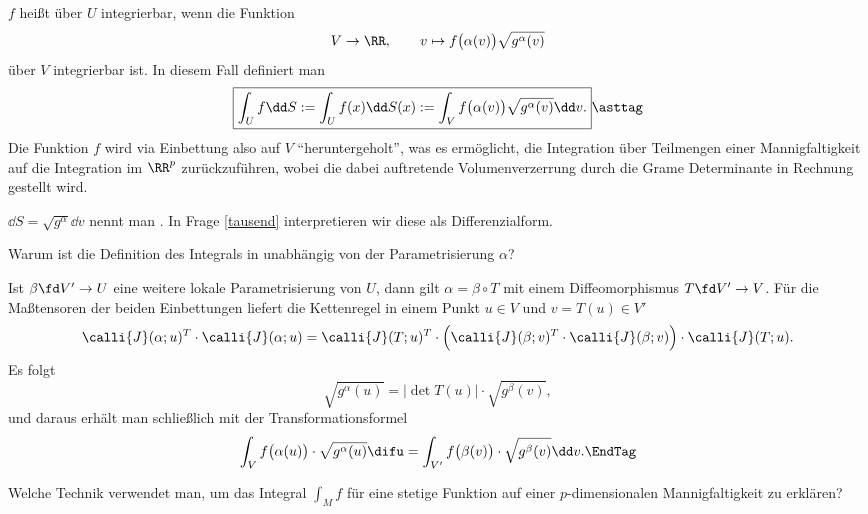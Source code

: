 \begin{antwort}
  $f$ heißt über $U$ integrierbar, wenn die Funktion
  \[
  V\to\RR, \qquad v\mapsto f\big( \alpha(v) \big) \sqrt{g^\alpha(v)}
  \]
  über $V$ integrierbar ist. In diesem Fall definiert man 
  \[\boxed{
    \int_U f \dd S := 
    \int_U f(x) \dd S(x) := 
    \int_V f\big(\alpha(v)\big) \sqrt{g^\alpha (v)} \dd v.}\asttag
  \]
  Die Funktion $f$ wird via Einbettung also auf $V$ 
  "`heruntergeholt"', was es ermöglicht, die Integration 
  über Teilmengen einer Mannigfaltigkeit 
  auf die Integration im $\RR^p$ zurückzuführen, wobei die dabei 
  auftretende Volumenverzerrung durch die 
  Gram\sch e Determinante in Rechnung gestellt wird.   
  
  $\dd S= \sqrt{g^\alpha}\dd v$ nennt man . 
  In Frage \ref{tausend} interpretieren wir diese als Differenzialform. 
  \AntEnd
\end{antwort} 

\begin{frage}
  Warum ist die Definition des Integrals in {\astref} 
  unabhängig von der Parametrisierung $\alpha$?
\end{frage}

\begin{antwort}
  Ist $\beta\fd V'\to U$ eine weitere lokale Parametrisierung von $U$, 
  dann gilt $\alpha=\beta \circ T$ mit einem Diffeomorphismus 
  $T \fd V'\to V$. Für die Maßtensoren der beiden Einbettungen 
  liefert die Kettenregel in einem Punkt $u\in V$ und $v=T(u)\in V'$ 
  \[
  \calli{J}(\alpha; u)^T \cdot 
  \calli{J}(\alpha; u) = 
  \calli{J}(T; u)^T \cdot 
  \Big( \calli{J}(\beta; v)^T \cdot \calli{J}(\beta; v) \Big) \cdot 
  \calli{J}(T;u).
  \]
  Es folgt 
  \[
  \sqrt{ g^\alpha(u) } = \big| \det T(u) \big| \cdot 
  \sqrt{ g^\beta(v) }, 
  \]
  und daraus erhält man schließlich mit der Transformationsformel
  \[
  \int_V f \big( \alpha(u) \big) \cdot \sqrt{g^\alpha(u)} \difu =
  \int_{V'} f \big( \beta(v) \big) \cdot \sqrt{g^\beta(v)} \dd v.
  \EndTag
  \]
\end{antwort}

\begin{frage}\label{ZerlegungderEins}
  Welche Technik verwendet man, um das Integral $\int_M f$ für eine 
  stetige Funktion auf einer $p$-dimensionalen Mannigfaltigkeit zu erklären?
\end{frage}

